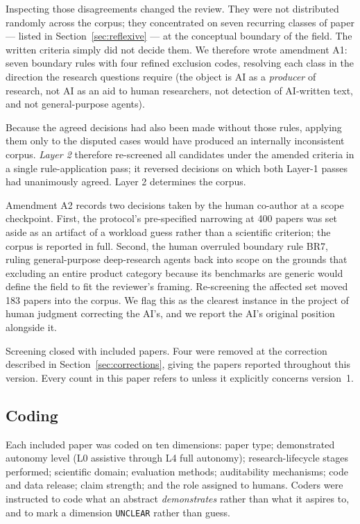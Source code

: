 Inspecting those disagreements changed the review. They were not distributed randomly across
the corpus; they concentrated on seven recurring classes of paper --- listed in
Section~\ref{sec:reflexive} --- at the conceptual boundary of the field. The written criteria
simply did not decide them. We therefore wrote amendment A1: seven boundary rules with four
refined exclusion codes, resolving each class in the direction the research questions require
(the object is AI as a \emph{producer} of research, not AI as an aid to human researchers, not
detection of AI-written text, and not general-purpose agents).

Because the \nAgreedLayerOne{} agreed decisions had also been made without those rules,
applying them only to the disputed cases would have produced an internally inconsistent
corpus. \emph{Layer 2} therefore re-screened all \nScreened{} candidates under the amended
criteria in a single rule-application pass; it reversed \nReversals{} decisions on which both
Layer-1 passes had unanimously agreed. Layer 2 determines the corpus.

Amendment A2 records two decisions taken by the human co-author at a scope checkpoint. First,
the protocol's pre-specified narrowing at 400 papers was set aside as an artifact of a
workload guess rather than a scientific criterion; the corpus is reported in full. Second,
the human overruled boundary rule BR7, ruling general-purpose deep-research agents back into
scope on the grounds that excluding an entire product category because its benchmarks are
generic would define the field to fit the reviewer's framing. Re-screening the affected set
moved 183 papers into the corpus. We flag this as the clearest instance in the project of
human judgment correcting the AI's, and we report the AI's original position alongside it.

Screening closed with \nCorpusVOne{} included papers. Four were removed at the correction
described in Section~\ref{sec:corrections}, giving the \nCorpus{} papers reported throughout
this version. Every count in this paper refers to \nCorpus{} unless it explicitly concerns
version~1.

\subsection{Coding}

Each included paper was coded on ten dimensions: paper type; demonstrated autonomy level
(L0 assistive through L4 full autonomy); research-lifecycle stages performed; scientific
domain; evaluation methods; auditability mechanisms; code and data release; claim strength;
and the role assigned to humans. Coders were instructed to code what an abstract
\emph{demonstrates} rather than what it aspires to, and to mark a dimension \texttt{UNCLEAR}
rather than guess.

